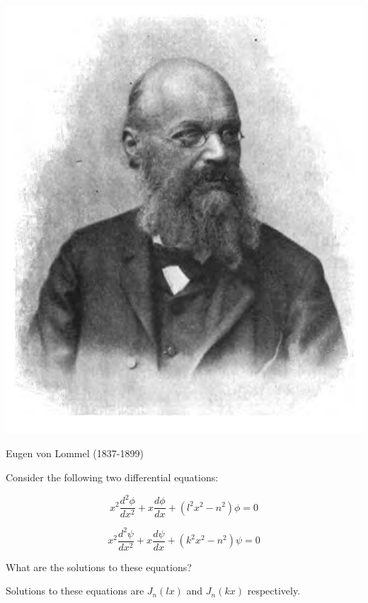 \begin{marginfigure}[-.0cm]
  \includegraphics{bessel/figures/e_lommel}
  \caption{Eugen von Lommel (1837-1899)}
\end{marginfigure}

Consider the following two differential equations:

\begin{equation}
x^2 \frac{d^2 \phi}{dx^2}  + x \frac{d \phi}{dx} + \left(l^2x^2 - n^2\right) \phi = 0 \label{eq-bessel-orth-1}
\end{equation} 

\begin{equation}
x^2 \frac{d^2 \psi}{dx^2}  + x \frac{d \psi}{dx} + \left(k^2x^2 - n^2\right) \psi = 0 \label{eq-bessel-orth-2}
\end{equation}

\begin{cue}
What are the solutions to these equations?  
\end{cue}

Solutions to these equations are $J_n(lx)$ and $J_n(kx)$ respectively.

